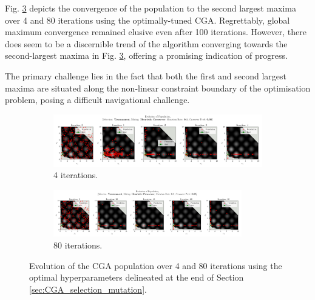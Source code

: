 \documentclass[10pt]{article}
\begin{document}
\begin{multicols}{2}
Fig. \ref{fig:optimal_convergence} depicts the convergence of the population to the second largest maxima over 4 and 80 iterations using the optimally-tuned CGA. Regrettably, global maximum convergence remained elusive even after 100 iterations. However, there does seem to be a discernible trend of the algorithm converging towards the second-largest maxima in Fig. \ref{fig:optimal_convergence}, offering a promising indication of progress. 

The primary challenge lies in the fact that both the first and second largest maxima are situated along the non-linear constraint boundary of the optimisation problem, posing a difficult navigational challenge.

\end{multicols}
\begin{figure}[H]
    \centering
    \begin{subfigure}{0.9\textwidth}
        \centering
        \includegraphics[width=\textwidth]{../figures/Permanent Images/0.1_0.65_Population.png}
        \caption{4 iterations.}
        \label{fig:optimal_5}
    \end{subfigure}
    \begin{subfigure}{\textwidth}
        \centering
        \includegraphics[width=0.9\textwidth]{../figures/Permanent Images/0.1_0.65_Population100.png}
        \caption{80 iterations.}
        \label{fig:optimat_100}
    \end{subfigure}
    \captionsetup{justification=centering}
    \caption{Evolution of the CGA population over 4 and 80 iterations using the optimal hyperparameters delineated at the end of Section \ref{sec:CGA_selection_mutation}.}
    \label{fig:optimal_convergence}
\end{figure}
\end{document}
